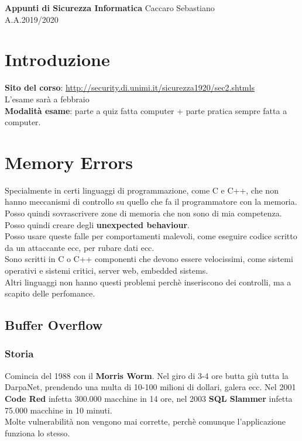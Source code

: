 \documentclass[a4paper,12pt]{article}
\begin{document}
\begin{titlepage}
\begin{center}
	\Large{\textbf{Appunti di Sicurezza Informatica}}
\vfill
\normalsize{Caccaro Sebastiano}\\
\normalsize{A.A.2019/2020}
\end{center}
\end{titlepage}

\tableofcontents

\clearpage


\section{Introduzione}
\textbf{Sito del corso}: \url{http://security.di.unimi.it/sicurezza1920/sec2.shtmls}\\
L'esame sarà a febbraio\\
\textbf{Modalità esame}: parte a quiz fatta computer + parte pratica sempre fatta a computer.

\section{Memory Errors}
Specialmente in certi linguaggi di programmazione, come C e C++, che non hanno meccanismi di controllo su quello che fa il programmatore con la memoria. Posso quindi sovrascrivere zone di memoria che non sono di mia competenza. Posso quindi creare degli \textbf{unexpected behaviour}.\\
Posso usare queste falle per comportamenti malevoli, come eseguire codice scritto da un attaccante ecc, per rubare dati ecc.\\
Sono scritti in C o C++ componenti che devono essere velocissimi, come sistemi operativi e sistemi critici, server web, embedded sistems.\\
Altri linguaggi non hanno questi problemi perchè inseriscono dei controlli, ma a scapito delle perfomance.

\subsection{Buffer Overflow}
\subsubsection{Storia}
Comincia del 1988 con il \textbf{Morris Worm}. Nel giro di 3-4 ore butta giù tutta la DarpaNet, prendendo una multa di 10-100 milioni di dollari, galera ecc.
Nel 2001 \textbf{Code Red} infetta 300.000 macchine in 14 ore, nel 2003 \textbf{SQL Slammer} infetta 75.000 macchine in 10 minuti.\\
Molte vulnerabilità non vengono mai corrette, perchè comunque l'applicazione funziona lo stesso.
\end{document}
